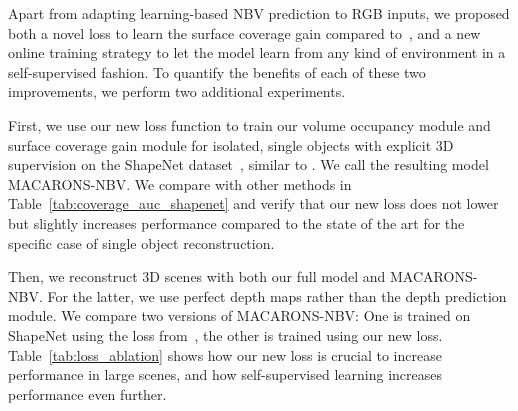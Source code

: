 Apart from adapting learning-based NBV prediction to RGB inputs, we proposed both a novel loss to learn the surface coverage gain compared to~\cite{guedon-nips22-scone-surface-coverage}, and a new online training strategy to let the model learn from any kind of environment in a self-supervised fashion. To quantify the benefits of each of these two improvements, we perform two additional experiments.

First, we use our new loss function to train our volume occupancy module and surface coverage gain module for isolated, single objects with explicit 3D supervision on the ShapeNet dataset~\cite{chang-15-shapenet}, similar to \cite{guedon-nips22-scone-surface-coverage}. We call the resulting model MACARONS-NBV. We compare with other methods in Table~\ref{tab:coverage_auc_shapenet} and verify that our new loss does not lower but slightly increases performance compared to the state of the art for the specific case of single object reconstruction.

Then, we reconstruct 3D scenes with both our full model and MACARONS-NBV. For the latter, we use perfect depth maps rather than the depth prediction module. We compare two versions of MACARONS-NBV: One is trained on ShapeNet using the loss from~\cite{guedon-nips22-scone-surface-coverage}, the other is trained using our new loss. Table~\ref{tab:loss_ablation} shows how our new loss is crucial to increase performance in large scenes, and how self-supervised learning increases performance even further.
